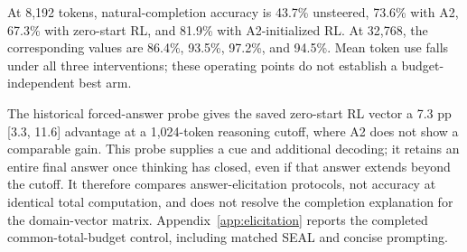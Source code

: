 At 8,192 tokens, natural-completion accuracy is 43.7\% unsteered, 73.6\% with A2, 67.3\% with zero-start RL, and 81.9\% with A2-initialized RL. At 32,768, the corresponding values are 86.4\%, 93.5\%, 97.2\%, and 94.5\%. Mean token use falls under all three interventions; these operating points do not establish a budget-independent best arm.

The historical forced-answer probe gives the saved zero-start RL vector a 7.3 pp [3.3, 11.6] advantage at a 1,024-token reasoning cutoff, where A2 does not show a comparable gain. This probe supplies a cue and additional decoding; it retains an entire final answer once thinking has closed, even if that answer extends beyond the cutoff. It therefore compares answer-elicitation protocols, not accuracy at identical total computation, and does not resolve the completion explanation for the domain-vector matrix. Appendix~\ref{app:elicitation} reports the completed common-total-budget control, including matched SEAL and concise prompting.


